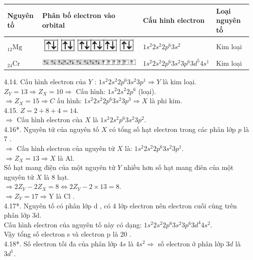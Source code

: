 \documentclass[10pt]{article}
\begin{document}
\begin{center}
\begin{tabular}{|l|l|l|l|}
\hline
Nguyên tố & Phân bố electron vào orbital & Cấu hinh electron & Loại nguyên tố \\
\hline
${ }_{12} \mathrm{Mg}$ & \includegraphics[max width=\textwidth]{2025_10_23_57761e23b8c46a11c3efg-09}
 & $1 s^{2} 2 s^{2} 2 p^{6} 3 s^{2}$ & Kim loại \\
\hline
${ }_{24} \mathrm{Cr}$ & \includegraphics[max width=\textwidth]{2025_10_23_57761e23b8c46a11c3efg-09(1)}
 & $1 s^{2} 2 s^{2} 2 p^{6} 3 s^{2} 3 p^{6} 3 d^{5} 4 s^{1}$ & Kim loại \\
\hline
\end{tabular}
\end{center}

4.14. Cấu hình electron của $Y$ : $1 s^{2} 2 s^{2} 2 p^{6} 3 s^{2} 3 p^{1} \Rightarrow Y$ là kim loại.\\
$Z_{Y}=13 \Rightarrow Z_{X}=10 \Rightarrow$ Cấu hình: $1 s^{2} 2 s^{2} 2 p^{6}$ (loại).\\
$\Rightarrow Z_{X}=15 \Rightarrow C$ ấu hình: $1 s^{2} 2 s^{2} 2 p^{6} 3 s^{2} 3 p^{3} \Rightarrow X$ là phi kim.\\
4.15. $Z=2+8+4=14$.\\
$\Rightarrow$ Cấu hình electron của $X$ là $1 s^{2} 2 s^{2} p^{6} 3 s^{2} 3 p^{2}$.\\
4.16*. Nguyên tử của nguyên tố $X$ có tổng số hạt electron trong các phân lớp $p$ là 7 .\\
$\Rightarrow$ Cấu hình electron của nguyên tử $X$ là: $1 s^{2} 2 s^{2} 2 p^{6} 3 s^{2} 3 p^{1}$.\\
$\Rightarrow Z_{X}=13 \Rightarrow X$ là Al.\\
Số hạt mang điện của một nguyên tử $Y$ nhiều hơn số hạt mang điên của một nguyên tử $X$ là 8 hạt.\\
$\Rightarrow 2 Z_{Y}-2 Z_{X}=8 \Leftrightarrow 2 Z_{Y}-2 \times 13=8$.\\
$\Rightarrow Z_{Y}=17 \Rightarrow \mathrm{Y}$ là Cl .\\
4.17*. Nguyên tố có phân lớp d , có 4 lớp electron nên electron cuối cùng trên phân lớp 3d.\\
Cấu hình electron của nguyên tố này có dạng: $1 s^{2} 2 s^{2} 2 p^{6} 3 s^{2} 3 p^{6} 3 d^{4} 4 s^{2}$.\\
Vậy tổng số electron s và electron p là 20 .\\
4.18*. Số electron tối đa của phân lớp $4 s$ là $4 s^{2} \Rightarrow$ số electron ở phân lớp $3 d$ là $3 d^{1}$.
\end{document}
